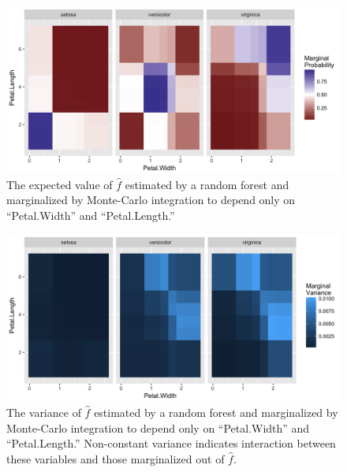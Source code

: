 \begin{figure}
  \includegraphics[width=\textwidth]{mp_int_mean.png}
  \caption{The expected value of $\hat{f}$ estimated by a random forest and marginalized by Monte-Carlo integration to depend only on ``Petal.Width'' and ``Petal.Length.'' \label{figure:mp_int_mean}}
\end{figure}

\begin{figure}
  \includegraphics[width=\textwidth]{mp_int_var.png}
  \caption{The variance of $\hat{f}$ estimated by a random forest and marginalized by Monte-Carlo integration to depend only on ``Petal.Width'' and ``Petal.Length.'' Non-constant variance indicates interaction between these variables and those marginalized out of $\hat{f}$. \label{figure:mp_int_var}}
\end{figure}

\clearpage
\newpage



\address{Zachary M. Jones\\
  The University of Washington\\
  Seattle, Washington\\
  United States\\}
